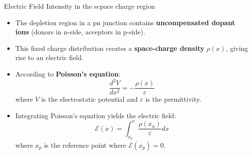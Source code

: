 \begin{frame}{Electric Field Intensity in the scpace charge region}
    \begin{itemize}
        \item The depletion region in a pn junction contains \textbf{uncompensated dopant ions} (donors in n-side, acceptors in p-side).
        \item This fixed charge distribution creates a \textbf{space-charge density} $\rho(x)$, giving rise to an electric field.
        \item According to \textbf{Poisson's equation}:
        \begin{equation}
            \frac{d^2 V}{dx^2} = -\frac{\rho(x)}{\varepsilon}
        \end{equation}
        where $V$ is the electrostatic potential and $\varepsilon$ is the permittivity.

        \item Integrating Poisson's equation yields the electric field:
        \begin{equation}
            \mathcal{E}(x) = \int_{x_p}^x \frac{\rho(x_n)}{\varepsilon} dx
        \end{equation}
        where $x_p$ is the reference point where $\mathcal{E}(x_p) = 0$.
    \end{itemize}
\end{frame}

